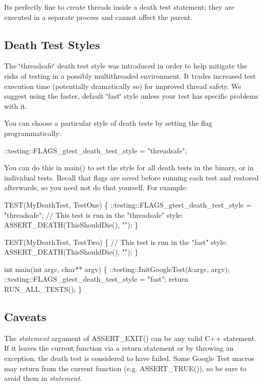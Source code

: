 It\textquotesingle{}s perfectly fine to create threads inside a death test statement; they are executed in a separate process and cannot affect the parent.

\subsection*{Death Test Styles}

The \char`\"{}threadsafe\char`\"{} death test style was introduced in order to help mitigate the risks of testing in a possibly multithreaded environment. It trades increased test execution time (potentially dramatically so) for improved thread safety. We suggest using the faster, default \char`\"{}fast\char`\"{} style unless your test has specific problems with it.

You can choose a particular style of death tests by setting the flag programmatically\+:


\begin{DoxyCode}
::testing::FLAGS\_gtest\_death\_test\_style = "threadsafe";
\end{DoxyCode}


You can do this in {\ttfamily main()} to set the style for all death tests in the binary, or in individual tests. Recall that flags are saved before running each test and restored afterwards, so you need not do that yourself. For example\+:


\begin{DoxyCode}
TEST(MyDeathTest, TestOne) \{
  ::testing::FLAGS\_gtest\_death\_test\_style = "threadsafe";
  // This test is run in the "threadsafe" style:
  ASSERT\_DEATH(ThisShouldDie(), "");
\}

TEST(MyDeathTest, TestTwo) \{
  // This test is run in the "fast" style:
  ASSERT\_DEATH(ThisShouldDie(), "");
\}

int main(int argc, char** argv) \{
  ::testing::InitGoogleTest(&argc, argv);
  ::testing::FLAGS\_gtest\_death\_test\_style = "fast";
  return RUN\_ALL\_TESTS();
\}
\end{DoxyCode}


\subsection*{Caveats}

The {\itshape statement} argument of {\ttfamily A\+S\+S\+E\+R\+T\+\_\+\+E\+X\+I\+T()} can be any valid C++ statement. If it leaves the current function via a {\ttfamily return} statement or by throwing an exception, the death test is considered to have failed. Some Google Test macros may return from the current function (e.\+g. {\ttfamily A\+S\+S\+E\+R\+T\+\_\+\+T\+R\+U\+E()}), so be sure to avoid them in {\itshape statement}.

